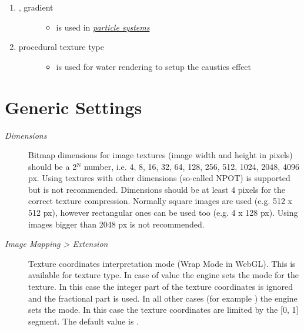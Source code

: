 \documentclass[a4paper,12pt,oneside]{sphinxmanual}
\begin{document}
\begin{enumerate}
\begin{description}
\begin{itemize}
\end{itemize}

\end{description}

\item {} \begin{description}
\item[{, gradient}] \leavevmode\begin{itemize}
\item {} 
is used in {\hyperref[particles:particles-textures]{\emph{particle systems}}}

\end{itemize}

\end{description}

\item {} \begin{description}
\item[{ procedural texture type}] \leavevmode\begin{itemize}
\item {} 
is used for water rendering to setup the caustics effect

\end{itemize}

\end{description}

\end{enumerate}


\section{Generic Settings}
\label{textures:id3}\label{textures:index-2}\begin{description}
\item[{\emph{Dimensions}}] \leavevmode
Bitmap dimensions for image textures (image width and height in pixels) should be a 2$^{\text{N}}$ number, i.e. 4, 8, 16, 32, 64, 128, 256, 512, 1024, 2048, 4096 px. Using textures with other dimensions (so-called NPOT) is supported but is not recommended. Dimensions should be at least 4 pixels for the correct texture compression. Normally square images are used (e.g. 512 x 512 px), however rectangular ones can be used too (e.g. 4 x 128 px). Using images bigger than 2048 px is not recommended.

\item[{\emph{Image Mapping \textgreater{} Extension}}] \leavevmode
Texture coordinates interpretation mode (Wrap Mode in WebGL). This is available for  texture type. In case of  value the engine sets the  mode for the texture. In this case the integer part of the texture coordinates is ignored and the fractional part is used. In all other cases (for example ) the engine sets the  mode. In this case the texture coordinates are limited by the {[}0, 1{]} segment. The default value is .

\end{description}
\end{document}
